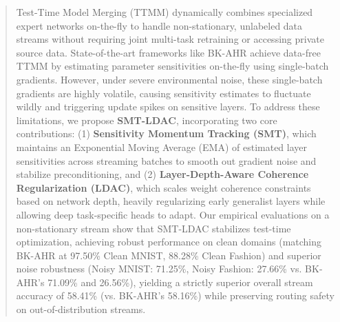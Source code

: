 \documentclass{article}
\theoremstyle{plain}
\theoremstyle{definition}
\theoremstyle{remark}
\begin{document}

\printAffiliationsAndNotice{}

\begin{abstract}
  Test-Time Model Merging (TTMM) dynamically combines specialized expert networks on-the-fly to handle non-stationary, unlabeled data streams without requiring joint multi-task retraining or accessing private source data. State-of-the-art frameworks like BK-AHR achieve data-free TTMM by estimating parameter sensitivities on-the-fly using single-batch gradients. However, under severe environmental noise, these single-batch gradients are highly volatile, causing sensitivity estimates to fluctuate wildly and triggering update spikes on sensitive layers. To address these limitations, we propose \textbf{SMT-LDAC}, incorporating two core contributions: (1) \textbf{Sensitivity Momentum Tracking (SMT)}, which maintains an Exponential Moving Average (EMA) of estimated layer sensitivities across streaming batches to smooth out gradient noise and stabilize preconditioning, and (2) \textbf{Layer-Depth-Aware Coherence Regularization (LDAC)}, which scales weight coherence constraints based on network depth, heavily regularizing early generalist layers while allowing deep task-specific heads to adapt. Our empirical evaluations on a non-stationary stream show that SMT-LDAC stabilizes test-time optimization, achieving robust performance on clean domains (matching BK-AHR at 97.50\% Clean MNIST, 88.28\% Clean Fashion) and superior noise robustness (Noisy MNIST: 71.25\%, Noisy Fashion: 27.66\% vs. BK-AHR's 71.09\% and 26.56\%), yielding a strictly superior overall stream accuracy of 58.41\% (vs. BK-AHR's 58.16\%) while preserving routing safety on out-of-distribution streams.
\end{abstract}
\end{document}
